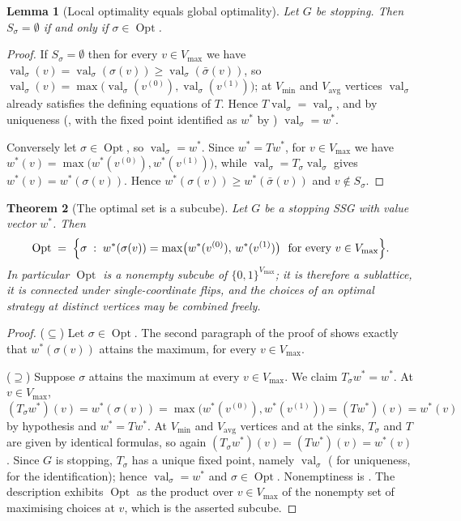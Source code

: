 \documentclass[11pt]{article}
\theoremstyle{plain}
\newtheorem{theorem}{Theorem}[section]
\newtheorem{lemma}[theorem]{Lemma}
\theoremstyle{definition}
\DeclareMathOperator{\val}{val}
\DeclareMathOperator{\Opt}{Opt}
\newcommand{\Vmax}{V_{\max}}
\newcommand{\Vmin}{V_{\min}}
\newcommand{\Vavg}{V_{\mathrm{avg}}}
\begin{document}
\begin{lemma}[Local optimality equals global optimality]\label{lem:local-global}
Let $G$ be stopping. Then $S_\sigma=\emptyset$ if and only if
$\sigma\in\Opt$.
\end{lemma}

\begin{proof}
If $S_\sigma=\emptyset$ then for every $v\in\Vmax$ we have
$\val_\sigma(v)=\val_\sigma(\sigma(v))\ge\val_\sigma(\bar\sigma(v))$,
so $\val_\sigma(v)=\max\bigl(\val_\sigma(v^{(0)}),\val_\sigma(v^{(1)})\bigr)$;
at $\Vmin$ and $\Vavg$ vertices $\val_\sigma$ already satisfies the
defining equations of $T$. Hence $T\val_\sigma=\val_\sigma$, and by
uniqueness (, with the fixed point identified as
$w^\ast$ by ) $\val_\sigma=w^\ast$.

Conversely let $\sigma\in\Opt$, so $\val_\sigma=w^\ast$. Since
$w^\ast=Tw^\ast$, for $v\in\Vmax$ we have
$w^\ast(v)=\max\bigl(w^\ast(v^{(0)}),w^\ast(v^{(1)})\bigr)$, while
$\val_\sigma=T_\sigma\val_\sigma$ gives $w^\ast(v)=w^\ast(\sigma(v))$.
Hence $w^\ast(\sigma(v))\ge w^\ast(\bar\sigma(v))$ and $v\notin S_\sigma$.
\end{proof}

\begin{theorem}[The optimal set is a subcube]\label{thm:opt-subcube}
Let $G$ be a stopping SSG with value vector $w^\ast$. Then
\[
  \Opt\;=\;\Bigl\{\sigma \;:\; w^\ast(\sigma(v))=\max\bigl(w^\ast(v^{(0)}),\,w^\ast(v^{(1)})\bigr)\ \text{ for every } v\in\Vmax\Bigr\}.
\]
In particular $\Opt$ is a nonempty subcube of $\{0,1\}^{\Vmax}$; it is
therefore a sublattice, it is connected under single-coordinate flips,
and the choices of an optimal strategy at distinct vertices may be
combined freely.
\end{theorem}

\begin{proof}
($\subseteq$) Let $\sigma\in\Opt$. The second paragraph of the proof of
 shows exactly that $w^\ast(\sigma(v))$ attains
the maximum, for every $v\in\Vmax$.

($\supseteq$) Suppose $\sigma$ attains the maximum at every $v\in\Vmax$.
We claim $T_\sigma w^\ast=w^\ast$. At $v\in\Vmax$,
$(T_\sigma w^\ast)(v)=w^\ast(\sigma(v))=\max\bigl(w^\ast(v^{(0)}),w^\ast(v^{(1)})\bigr)=(Tw^\ast)(v)=w^\ast(v)$
by hypothesis and $w^\ast=Tw^\ast$. At $\Vmin$ and $\Vavg$ vertices and
at the sinks, $T_\sigma$ and $T$ are given by identical formulas, so
again $(T_\sigma w^\ast)(v)=(Tw^\ast)(v)=w^\ast(v)$. Since $G$ is
stopping, $T_\sigma$ has a unique fixed point, namely $\val_\sigma$
( for uniqueness, 
for the identification); hence $\val_\sigma=w^\ast$ and
$\sigma\in\Opt$. Nonemptiness is . The description
exhibits $\Opt$ as the product over $v\in\Vmax$ of the nonempty set of
maximising choices at $v$, which is the asserted subcube.
\end{proof}
\end{document}
